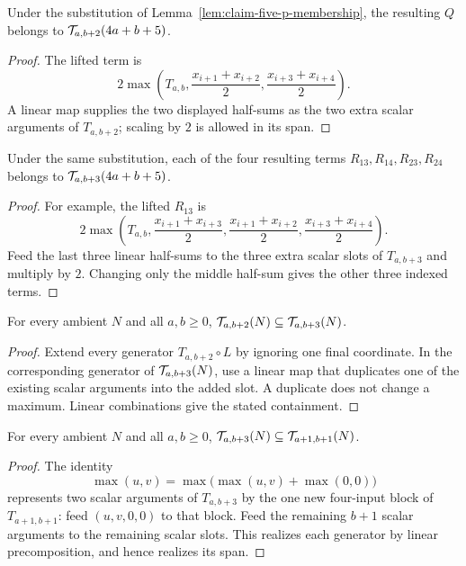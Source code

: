 \begin{lemma}
  \label{lem:claim-five-q-membership}
  Under the substitution of Lemma~\ref{lem:claim-five-p-membership}, the
  resulting $Q$ belongs to $\mathcal{T}_{a,b+2}(4a+b+5)$.
\end{lemma}
\begin{proof}
  The lifted term is
  \[
    2\max\left(T_{a,b},\frac{x_{i+1}+x_{i+2}}2,
                         \frac{x_{i+3}+x_{i+4}}2\right).
  \]
  A linear map supplies the two displayed half-sums as the two extra scalar
  arguments of $T_{a,b+2}$; scaling by $2$ is allowed in its span.
\end{proof}

\begin{lemma}
  \label{lem:claim-five-r-membership}
  Under the same substitution, each of the four resulting terms
  $R_{13},R_{14},R_{23},R_{24}$ belongs to
  $\mathcal{T}_{a,b+3}(4a+b+5)$.
\end{lemma}
\begin{proof}
  For example, the lifted $R_{13}$ is
  \[
    2\max\left(T_{a,b},\frac{x_{i+1}+x_{i+3}}2,
      \frac{x_{i+1}+x_{i+2}}2,\frac{x_{i+3}+x_{i+4}}2\right).
  \]
  Feed the last three linear half-sums to the three extra scalar slots of
  $T_{a,b+3}$ and multiply by $2$.  Changing only the middle half-sum gives
  the other three indexed terms.
\end{proof}

\begin{lemma}
  \label{lem:tspace-b2-b3}
  For every ambient $N$ and all $a,b\geq0$,
  $\mathcal{T}_{a,b+2}(N)\subseteq\mathcal{T}_{a,b+3}(N)$.
\end{lemma}
\begin{proof}
  Extend every generator $T_{a,b+2}\circ L$ by ignoring one final coordinate.
  In the corresponding generator of $\mathcal{T}_{a,b+3}(N)$, use a linear map that
  duplicates one of the existing scalar arguments into the added slot.  A
  duplicate does not change a maximum.  Linear combinations give the stated
  containment.
\end{proof}

\begin{lemma}
  \label{lem:tspace-b3-next}
  For every ambient $N$ and all $a,b\geq0$,
  $\mathcal{T}_{a,b+3}(N)\subseteq\mathcal{T}_{a+1,b+1}(N)$.
\end{lemma}
\begin{proof}
  The identity
  \[
    \max(u,v)=\max\bigl(\max(u,v)+\max(0,0)\bigr)
  \]
  represents two scalar arguments of $T_{a,b+3}$ by the one new four-input
  block of $T_{a+1,b+1}$: feed $(u,v,0,0)$ to that block.  Feed the remaining
  $b+1$ scalar arguments to the remaining scalar slots.  This realizes each
  generator by linear precomposition, and hence realizes its span.
\end{proof}

